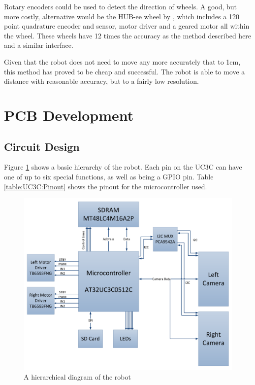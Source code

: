 Rotary encoders could be used to detect the direction of wheels. A good, but more costly, alternative would be the HUB-ee wheel by \cite{Creative_Robotics}, which includes a 120 point quadrature encoder and sensor, motor driver and a geared motor all within the wheel. These wheels have 12 times the accuracy as the method described here and a similar interface. 
 
Given that the robot does not need to move any more accurately that to 1cm, this method has proved to be cheap and successful. The robot is able to move a distance with reasonable accuracy, but to a fairly low resolution.

\section{PCB Development}\label{Section:PCB_Dev}
\subsection{Circuit Design}

Figure \ref{fig:Hierarchical} shows a basic hierarchy of the robot. Each pin on the UC3C can have one of up to six special functions, as well as being a GPIO pin.  Table \ref{table:UC3C:Pinout} shows the pinout for the microcontroller used. 
\begin{figure}
\includegraphics[width=\textwidth]{Figures/hierarchy.pdf}
\caption{A hierarchical diagram of the robot}
\label{fig:Hierarchical}
\end{figure}

